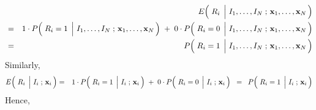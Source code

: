 \begin{eqnarray*}
&&
	E\!\left(\,
	\left.\overset{{\color{white}.}}{R_{i}}\;\,\right\vert\,
	I_{1},\ldots,I_{N}\;;\,\mathbf{x}_{1},\ldots,\mathbf{x}_{N}
	\,\right)
\\
& = &
	1 \cdot P\!\left(\,
		\left.\overset{{\color{white}.}}{R_{i}}=1\;\,\right\vert\,
		I_{1},\ldots,I_{N}\;;\,\mathbf{x}_{1},\ldots,\mathbf{x}_{N}
		\,\right)
	\; + \;
	0 \cdot P\!\left(\,
		\left.\overset{{\color{white}.}}{R_{i}}=0\;\,\right\vert\,
		I_{1},\ldots,I_{N}\;;\,\mathbf{x}_{1},\ldots,\mathbf{x}_{N}
		\,\right)
\\
& = &
	P\!\left(\,
		\left.\overset{{\color{white}.}}{R_{i}}=1\;\,\right\vert\,
		I_{1},\ldots,I_{N}\;;\,\mathbf{x}_{1},\ldots,\mathbf{x}_{N}
		\,\right)
\end{eqnarray*}
Similarly,
\begin{eqnarray*}
E\!\left(\,\left.\overset{{\color{white}.}}{R_{i}}\;\,\right\vert\,I_{i}\;;\,\mathbf{x}_{i}\,\right)
& = &
	1 \cdot P\!\left(\,\left.\overset{{\color{white}.}}{R_{i}}=1\;\,\right\vert\,I_{i}\;;\,\mathbf{x}_{i}\,\right)
	\; + \;
	0 \cdot P\!\left(\,\left.\overset{{\color{white}.}}{R_{i}}=0\;\,\right\vert\,I_{i}\;;\,\mathbf{x}_{i}\,\right)
\;\; = \;\;
	P\!\left(\,\left.\overset{{\color{white}.}}{R_{i}}=1\;\,\right\vert\,I_{i}\;;\,\mathbf{x}_{i}\,\right)
\end{eqnarray*}
Hence,
